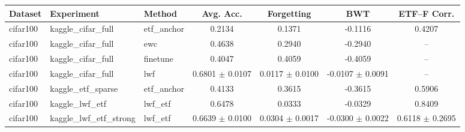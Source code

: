 \begin{tabular}{lllcccc}
\hline
Dataset & Experiment & Method & Avg. Acc. & Forgetting & BWT & ETF--F Corr. \\
\hline
cifar100 & kaggle_cifar_full & etf_anchor & 0.2134 & 0.1371 & -0.1116 & 0.4207 \\
cifar100 & kaggle_cifar_full & ewc & 0.4638 & 0.2940 & -0.2940 & -- \\
cifar100 & kaggle_cifar_full & finetune & 0.4047 & 0.4059 & -0.4059 & -- \\
cifar100 & kaggle_cifar_full & lwf & 0.6801 $\pm$ 0.0107 & 0.0117 $\pm$ 0.0100 & -0.0107 $\pm$ 0.0091 & -- \\
cifar100 & kaggle_etf_sparse & etf_anchor & 0.4133 & 0.3615 & -0.3615 & 0.5906 \\
cifar100 & kaggle_lwf_etf & lwf_etf & 0.6478 & 0.0333 & -0.0329 & 0.8409 \\
cifar100 & kaggle_lwf_etf_strong & lwf_etf & 0.6639 $\pm$ 0.0100 & 0.0304 $\pm$ 0.0017 & -0.0300 $\pm$ 0.0022 & 0.6118 $\pm$ 0.2695 \\
\hline
\end{tabular}
